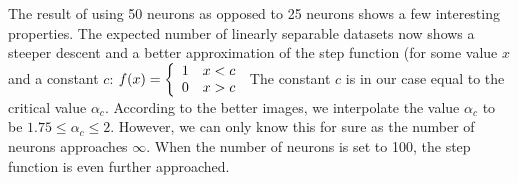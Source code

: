 The result of using 50 neurons as opposed to 25 neurons shows a few interesting properties. The expected number of linearly separable datasets now shows a steeper descent and a better approximation of the step function (for some value $x$ and a constant $c$: 
$f(x) = \left\{ 
  \begin{array}{l l}
    1 & x < c\\
    0 & x > c
  \end{array} \right.$
The constant $c$ is in our case equal to the critical value $\alpha_c$. According to the better images, we interpolate the value $\alpha_c$ to be $1.75 \leq \alpha_c \leq 2$. However, we can only know this for sure as the number of neurons approaches $\infty$.
When the number of neurons is set to 100, the step function is even further approached. 